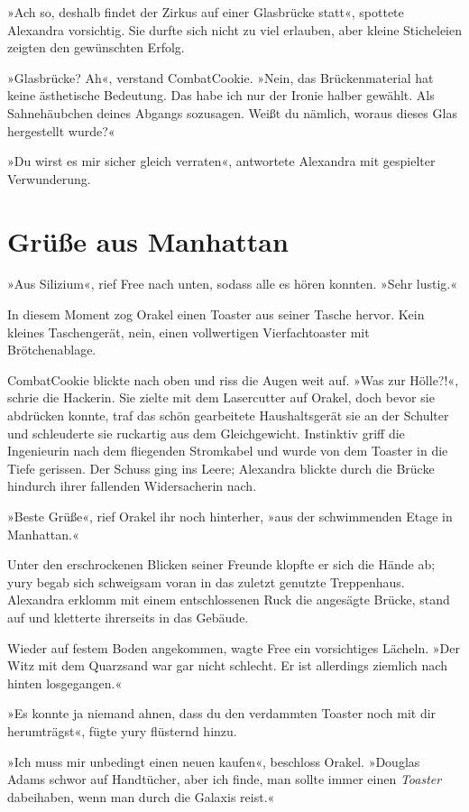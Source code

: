 »Ach so, deshalb findet der Zirkus auf einer Glasbrücke statt«, spottete Alexandra vorsichtig. Sie durfte sich nicht zu viel erlauben, aber kleine Sticheleien zeigten den gewünschten Erfolg.

»Glasbrücke? Ah«, verstand CombatCookie. »Nein, das Brückenmaterial hat keine ästhetische Bedeutung. Das habe ich nur der Ironie halber gewählt. Als Sahnehäubchen deines Abgangs sozusagen. Weißt du nämlich, woraus dieses Glas hergestellt wurde?«

»Du wirst es mir sicher gleich verraten«, antwortete Alexandra mit gespielter Verwunderung.


\chapter{Grüße aus Manhattan}

»Aus Silizium«, rief Free nach unten, sodass alle es hören konnten. »Sehr lustig.«

In diesem Moment zog Orakel einen Toaster aus seiner Tasche hervor. Kein kleines Taschengerät, nein, einen vollwertigen Vierfachtoaster mit Brötchenablage.

CombatCookie blickte nach oben und riss die Augen weit auf. »Was zur Hölle?!«, schrie die Hackerin. Sie zielte mit dem Lasercutter auf Orakel, doch bevor sie abdrücken konnte, traf das schön gearbeitete Haushaltsgerät sie an der Schulter und schleuderte sie ruckartig aus dem Gleichgewicht. Instinktiv griff die Ingenieurin nach dem fliegenden Stromkabel und wurde von dem Toaster in die Tiefe gerissen. Der Schuss ging ins Leere; Alexandra blickte durch die Brücke hindurch ihrer fallenden Widersacherin nach.

»Beste Grüße«, rief Orakel ihr noch hinterher, »aus der schwimmenden Etage in Manhattan.«

Unter den erschrockenen Blicken seiner Freunde klopfte er sich die Hände ab; yury begab sich schweigsam voran in das zuletzt genutzte Treppenhaus. Alexandra erklomm mit einem entschlossenen Ruck die angesägte Brücke, stand auf und kletterte ihrerseits in das Gebäude.

Wieder auf festem Boden angekommen, wagte Free ein vorsichtiges Lächeln. »Der Witz mit dem Quarzsand war gar nicht schlecht. Er ist allerdings ziemlich nach hinten losgegangen.«

»Es konnte ja niemand ahnen, dass du den verdammten Toaster noch mit dir herumträgst«, fügte yury flüsternd hinzu.

»Ich muss mir unbedingt einen neuen kaufen«, beschloss Orakel. »Douglas Adams schwor auf Handtücher, aber ich finde, man sollte immer einen \textit{Toaster} dabeihaben, wenn man durch die Galaxis reist.«

